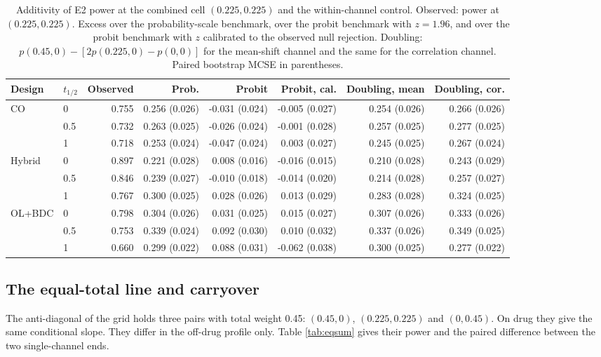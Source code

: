 \documentclass[
  11pt,
]{article}
\begin{document}
\begin{table}[H]
\small\centering
\caption{Additivity of E2 power at the combined cell $(0.225, 0.225)$ and the within-channel control. Observed: power at $(0.225, 0.225)$. Excess over the probability-scale benchmark, over the probit benchmark with $z = 1.96$, and over the probit benchmark with $z$ calibrated to the observed null rejection. Doubling: $p(0.45, 0) - [2p(0.225, 0) - p(0, 0)]$ for the mean-shift channel and the same for the correlation channel. Paired bootstrap MCSE in parentheses.}
\label{tab:additivity}
\begin{tabular}{llrrrrrr}
\toprule
Design & $t_{1/2}$ & Observed & Prob. & Probit & Probit, cal. & Doubling, mean & Doubling, cor. \\
\midrule
CO & 0 & 0.755 & 0.256 (0.026) & -0.031 (0.024) & -0.005 (0.027) & 0.254 (0.026) & 0.266 (0.026) \\
 & 0.5 & 0.732 & 0.263 (0.025) & -0.026 (0.024) & -0.001 (0.028) & 0.257 (0.025) & 0.277 (0.025) \\
 & 1 & 0.718 & 0.253 (0.024) & -0.047 (0.024) & 0.003 (0.027) & 0.245 (0.025) & 0.267 (0.024) \\
Hybrid & 0 & 0.897 & 0.221 (0.028) & 0.008 (0.016) & -0.016 (0.015) & 0.210 (0.028) & 0.243 (0.029) \\
 & 0.5 & 0.846 & 0.239 (0.027) & -0.010 (0.018) & -0.014 (0.020) & 0.214 (0.028) & 0.257 (0.027) \\
 & 1 & 0.767 & 0.300 (0.025) & 0.028 (0.026) & 0.013 (0.029) & 0.283 (0.028) & 0.324 (0.025) \\
OL+BDC & 0 & 0.798 & 0.304 (0.026) & 0.031 (0.025) & 0.015 (0.027) & 0.307 (0.026) & 0.333 (0.026) \\
 & 0.5 & 0.753 & 0.339 (0.024) & 0.092 (0.030) & 0.010 (0.032) & 0.337 (0.026) & 0.349 (0.025) \\
 & 1 & 0.660 & 0.299 (0.022) & 0.088 (0.031) & -0.062 (0.038) & 0.300 (0.025) & 0.277 (0.022) \\
\bottomrule
\end{tabular}
\end{table}

\subsection{The equal-total line and carryover}\label{sec-eqsum}

The anti-diagonal of the grid holds three pairs with total weight
0.45: \((0.45, 0)\), \((0.225, 0.225)\) and \((0, 0.45)\). On drug they give
the same conditional slope. They differ in the off-drug profile only.
Table \ref{tab:eqsum} gives their power and the paired difference
between the two single-channel ends.
\end{document}

